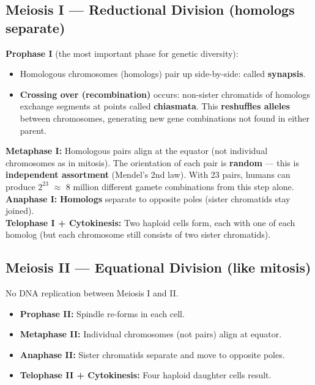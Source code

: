 \documentclass[11pt, letterpaper]{article}
\begin{document}
\subsection*{Meiosis I --- Reductional Division (homologs separate)}

\begin{tcolorbox}[colback=part5bg, colframe=sectionteal, arc=3pt, boxrule=1pt]
\textbf{Prophase I} (the most important phase for genetic diversity):
\begin{itemize}[noitemsep, leftmargin=*]
  \item Homologous chromosomes (homologs) pair up side-by-side: called \textbf{synapsis}.
  \item \textbf{Crossing over (recombination)} occurs: non-sister chromatids of homologs
        exchange segments at points called \textbf{chiasmata}. This \textbf{reshuffles alleles}
        between chromosomes, generating new gene combinations not found in either parent.
\end{itemize}
\textbf{Metaphase I:} Homologous pairs align at the equator (not individual chromosomes as in
mitosis). The orientation of each pair is \textbf{random} --- this is \textbf{independent
assortment} (Mendel's 2nd law). With 23 pairs, humans can produce $2^{23}$ $\approx$ 8 million
different gamete combinations from this step alone.\\[4pt]
\textbf{Anaphase I:} \textbf{Homologs} separate to opposite poles (sister chromatids stay joined).\\[2pt]
\textbf{Telophase I + Cytokinesis:} Two haploid cells form, each with one of each homolog (but
each chromosome still consists of two sister chromatids).
\end{tcolorbox}

\subsection*{Meiosis II --- Equational Division (like mitosis)}

No DNA replication between Meiosis I and II.
\begin{itemize}[noitemsep]
  \item \textbf{Prophase II:} Spindle re-forms in each cell.
  \item \textbf{Metaphase II:} Individual chromosomes (not pairs) align at equator.
  \item \textbf{Anaphase II:} Sister chromatids separate and move to opposite poles.
  \item \textbf{Telophase II + Cytokinesis:} Four haploid daughter cells result.
\end{itemize}
\end{document}
